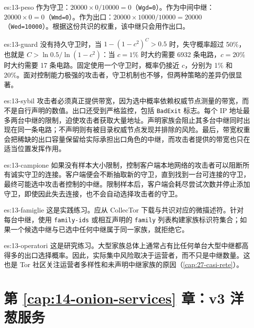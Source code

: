\begin{soluzione}{es:13-peso}
作为守卫：$20000\times0/10000=0$（\texttt{Wgd=0}）。作为中间中继：$20000\times0=0$（\texttt{Wmd=0}）。作为出口：$20000\times10000/10000=20000$（\texttt{Wed=10000}）。根据这份共识的权重，该中继只会用作出口。
\end{soluzione}

\begin{soluzione}{es:13-guard}
没有持久守卫时，当 $1-(1-c^2)^C>0.5$ 时，失守概率超过 50\%，也就是 $C>\ln0.5/\ln(1-c^2)$：当 $c=1\%$ 时大约需要 \num{6932} 条电路，$c=20\%$ 时大约需要 17 条电路。固定使用一个守卫时，概率仍接近 $c$，分别为 1\% 和 20\%。面对控制能力极强的攻击者，守卫机制也不够，但两种策略的差异仍很显著。
\end{soluzione}

\begin{soluzione}{es:13-sybil}
攻击者必须真正提供带宽，因为选中概率依赖权威节点测量的带宽，而不是自行声明的数值。出口还受到严格监控，包括 \texttt{BadExit} 标志。每个 IP 地址最多两台中继的限制，迫使攻击者获取大量地址。声明家族会阻止其多台中继同时出现在同一条电路；不声明则有被目录权威节点发现并排除的风险。最后，带宽权重会把稀缺的出口容量保留给实际承担出口角色的中继，而攻击者提供的带宽也只在适当位置发挥作用。
\end{soluzione}

\begin{soluzione}{es:13-campione}
如果没有样本大小限制，控制客户端本地网络的攻击者可以阻断所有诚实守卫的连接。客户端便会不断抽取新的守卫，直到找到一台可连接的守卫，最终可能选中攻击者控制的中继。限制样本后，客户端会耗尽尝试次数并停止添加守卫，即使因此失去连接，也不会自动选择攻击者的守卫。
\end{soluzione}

\begin{soluzione}{es:13-famiglie}
这是实践练习。应从 CollecTor 下载与共识对应的微描述符。针对每台中继，使用 \texttt{family-ids} 或相互声明的 \texttt{family} 列表构建家族标识符集合；如果一个候选中继与已选中任何中继属于同一家族，就拒绝它。
\end{soluzione}

\begin{soluzione}{es:13-operatori}
这是研究练习。大型家族总体上通常占有比任何单台大型中继都高得多的出口选择概率。因此，实际集中风险取决于运营者，而不只是中继数量。这也是 Tor 社区关注运营者多样性和未声明中继家族的原因（\cref{cap:27-casi-rete}）。
\end{soluzione}

\section*{第 \ref{cap:14-onion-services} 章：v3 洋葱服务}

